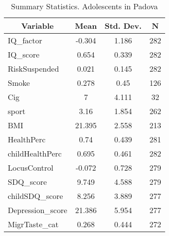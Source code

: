 
\begin{table}[htbp]\centering \caption{Summary Statistics. Adolescents in Padova \label{cityAdolPadova}}
\begin{tabular}{l c c  c}\hline\hline
\multicolumn{1}{c}{\textbf{Variable}} & \textbf{Mean}
 & \textbf{Std. Dev.} & \textbf{N}\\ \hline
IQ\_factor & -0.304 & 1.186  & 282\\
IQ\_score & 0.654 & 0.339  & 282\\
RiskSuspended & 0.021 & 0.145  & 282\\
Smoke & 0.278 & 0.45  & 126\\
Cig & 7 & 4.111  & 32\\
sport & 3.16 & 1.854  & 262\\
BMI & 21.395 & 2.558  & 213\\
HealthPerc & 0.74 & 0.439  & 281\\
childHealthPerc & 0.695 & 0.461  & 282\\
LocusControl & -0.072 & 0.728  & 279\\
SDQ\_score & 9.749 & 4.588  & 279\\
childSDQ\_score & 8.256 & 3.889  & 277\\
Depression\_score & 21.386 & 5.954  & 277\\
MigrTaste\_cat & 0.268 & 0.444  & 272\\
\hline\end{tabular}
\end{table}
